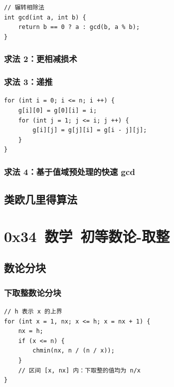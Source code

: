 \documentclass{article}
\begin{document}
\begin{verbatim}
// 辗转相除法
int gcd(int a, int b) {
    return b == 0 ? a : gcd(b, a % b);
}
\end{verbatim}

\subsubsection{求法 2：更相减损术}


\subsubsection{求法 3：递推}

\begin{verbatim}
for (int i = 0; i <= n; i ++) {
    g[i][0] = g[0][i] = i;
    for (int j = 1; j <= i; j ++) {
        g[i][j] = g[j][i] = g[i - j][j];
    }
}
\end{verbatim}

\subsubsection{求法 4：基于值域预处理的快速 gcd}


\subsection{类欧几里得算法}


\section{0x34\ 数学\ 初等数论-取整}

\subsection{数论分块}

\subsubsection{下取整数论分块}

\begin{verbatim}
// h 表示 x 的上界
for (int x = 1, nx; x <= h; x = nx + 1) {
    nx = h;
    if (x <= n) {
        chmin(nx, n / (n / x));
    }
    // 区间 [x, nx] 内：下取整的值均为 n/x
}
\end{verbatim}
\end{document}
